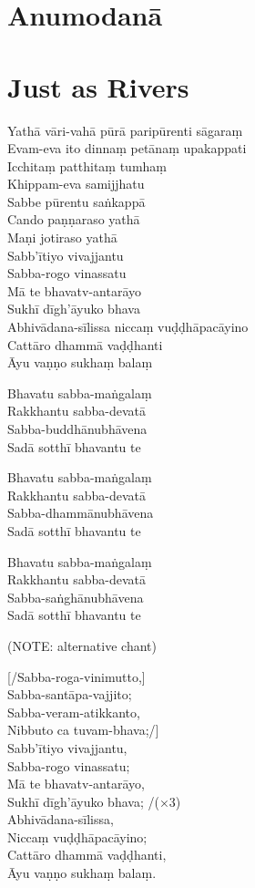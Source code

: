 \chapter{Anumodanā}

\chapter{Just as Rivers}

Yathā vāri-vahā pūrā paripūrenti sāgaraṃ\\
Evam-eva ito dinnaṃ petānaṃ upakappati\\
Icchitaṃ patthitaṃ tumhaṃ\\
Khippam-eva samijjhatu\\
Sabbe pūrentu saṅkappā\\
Cando paṇṇaraso yathā\\
Maṇi jotiraso yathā\\
Sabb'ītiyo vivajjantu\\
Sabba-rogo vinassatu\\
Mā te bhavatv-antarāyo\\
Sukhī dīgh'āyuko bhava\\
Abhivādana-sīlissa niccaṃ vuḍḍhāpacāyino\\
Cattāro dhammā vaḍḍhanti\\
Āyu vaṇṇo sukhaṃ balaṃ

Bhavatu sabba-maṅgalaṃ\\
Rakkhantu sabba-devatā\\
Sabba-buddhānubhāvena\\
Sadā sotthī bhavantu te

Bhavatu sabba-maṅgalaṃ\\
Rakkhantu sabba-devatā\\
Sabba-dhammānubhāvena\\
Sadā sotthī bhavantu te

Bhavatu sabba-maṅgalaṃ\\
Rakkhantu sabba-devatā\\
Sabba-saṅghānubhāvena\\
Sadā sotthī bhavantu te

(NOTE: alternative chant)

[/Sabba-roga-vinimutto,]\\
Sabba-santāpa-vajjito;\\
Sabba-veram-atikkanto,\\
Nibbuto ca tuvam-bhava;/]\\
Sabb’ītiyo vivajjantu,\\
Sabba-rogo vinassatu;\\
Mā te bhavatv-antarāyo,\\
Sukhī dīgh’āyuko bhava; /(×3)\\
Abhivādana-sīlissa,\\
Niccaṃ vuḍḍhāpacāyino;\\
Cattāro dhammā vaḍḍhanti,\\
Āyu vaṇṇo sukhaṃ balaṃ.

